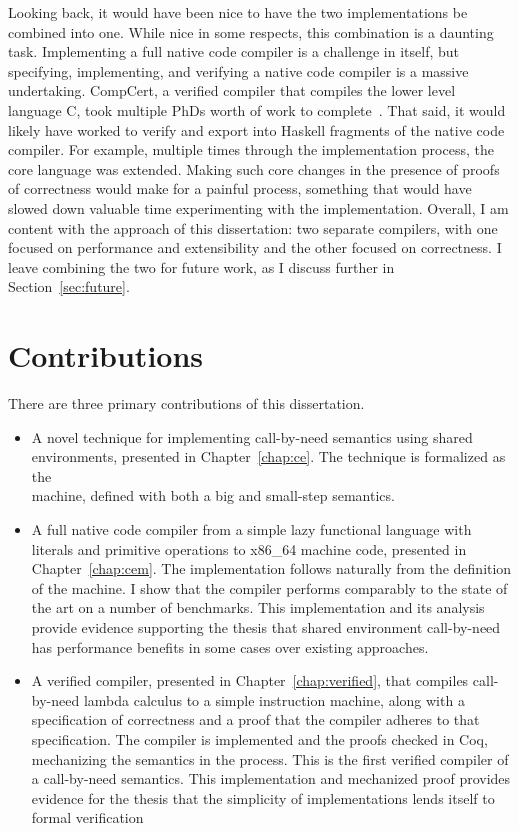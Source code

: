 Looking back, it would have been nice to have the two implementations be
combined into one. While nice in some respects, this combination is a daunting
task. Implementing a full native code compiler is a challenge in itself, but
specifying, implementing, and verifying a native code compiler is a massive
undertaking. CompCert, a verified compiler that compiles the lower level
language C, took multiple PhDs worth of work to
complete~\cite{leroy2012compcert}. That said, it would likely have worked to
verify and export into Haskell fragments of the native code compiler.  For
example, multiple times through the implementation process, the core language
was extended. Making such core changes in the presence of proofs of correctness
would make for a painful process, something that would have slowed down valuable
time experimenting with the implementation. Overall, I am content with the
approach of this dissertation: two separate compilers, with one focused on
performance and extensibility and the other focused on correctness. I leave
combining the two for future work, as I discuss further in
Section~\ref{sec:future}.

\section{Contributions}

There are three primary contributions of this dissertation.

\begin{itemize}
\item A novel technique for implementing call-by-need semantics using shared
environments, presented in Chapter~\ref{chap:ce}. The technique is formalized as
the \ce \\ machine, defined with both a big and small-step semantics.

\item A full native code compiler from a simple lazy functional language with
literals and primitive operations to x86\_64 machine code, presented in
Chapter~\ref{chap:cem}. The implementation follows naturally from the definition
of the \ce machine. I show that the compiler performs comparably to the state of
the art on a number of benchmarks.  This implementation and its analysis provide
evidence supporting the thesis that shared environment call-by-need has
performance benefits in some cases over existing approaches.

\item A verified compiler, presented in Chapter~\ref{chap:verified}, that
compiles call-by-need lambda calculus to a simple instruction machine, along
with a specification of correctness and a proof that the compiler adheres to
that specification. The compiler is implemented and the proofs checked in Coq,
mechanizing the \ce semantics in the process. This is the first verified
compiler of a call-by-need semantics. This implementation and mechanized proof
provides evidence for the thesis that the simplicity of \ce implementations
lends itself to formal verification 
\end{itemize}


